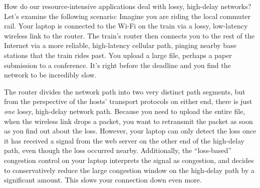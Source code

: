 



How do our resource-intensive applications deal with lossy, high-delay networks?
Let's examine the following scenario: Imagine you are riding the local commuter
rail. Your laptop is connected to the Wi-Fi on the train via a lossy,
low-latency wireless link to the router. The train's router then connects you
to the rest of the Internet via a more reliable, high-latency cellular path,
pinging nearby base stations that the train rides past. You upload a large file,
perhaps a paper submission to a conference. It's right before the deadline
and you find the network to be incredibly slow.

The router divides the network path into two very distinct path segments, but
from the perspective of the hosts' transport protocols on either end, there is
just \textit{one} lossy, high-delay network path. Because you need to upload
the entire file, when the wireless link drops a packet, you want to retransmit
the packet as soon as you find out about the loss. However, your laptop can
only detect the loss once it has received a signal from the web server on the
other end of the high-delay path, even though the loss occurred nearby.
Additionally, the ``loss-based'' congestion control on your laptop interprets
the signal as congestion, and decides to conservatively reduce the large
congestion window on the high-delay path by a significant amount. This slows
your connection down even more.

